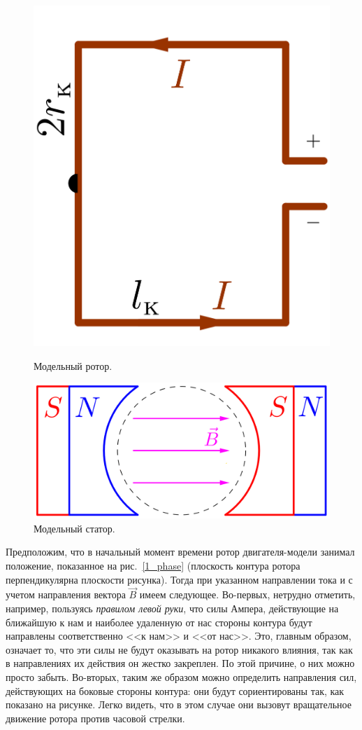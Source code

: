 \documentclass[12pt, a4paper, openany]{extarticle}
\begin{document}
\begin{figure}[h]
	\begin{center}
		\begin{minipage}[h]{0.40\linewidth}
			\centering\includegraphics[height=4 cm]{rotor_in_model.png}
			\caption{Модельный ротор.}
			\label{rotor_in_model} 
		\end{minipage}
		\hfill 
		\begin{minipage}[h]{0.59\linewidth}
			\centering\includegraphics[height=4 cm]{stator_2.png}
			\caption{Модельный статор.}
			\label{stator_in_model}
		\end{minipage}
	\end{center}
\end{figure}

Предположим, что в начальный момент времени ротор двигателя-модели занимал положение, показанное на рис.~\ref{1_phase} (плоскость контура ротора перпендикулярна плоскости рисунка). 
Тогда при указанном направлении тока и с учетом направления вектора $\vec{B}$ имеем следующее.
Во-первых, нетрудно отметить, например, пользуясь \textit{правилом левой руки}, что силы Ампера, действующие на ближайшую к нам и наиболее удаленную от нас стороны контура будут направлены соответственно <<к нам>> и <<от нас>>. 
Это, главным образом, означает то, что эти силы не будут оказывать на ротор никакого влияния, так как в направлениях их действия он жестко закреплен. 
По этой причине, о них можно просто забыть. 
Во-вторых, таким же образом можно определить направления сил, действующих на боковые стороны контура: они будут сориентированы так, как показано на рисунке. 
Легко видеть, что в этом случае они вызовут вращательное движение ротора против часовой стрелки.
\end{document}
